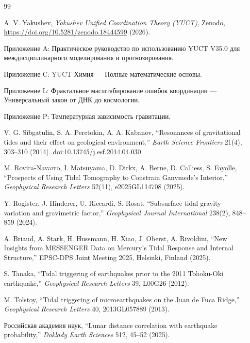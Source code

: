 \documentclass[12pt,a4paper]{article}
\theoremstyle{remark}
\begin{document}
	\begin{thebibliography}{99}
		
		A. V. Yakushev, \emph{Yakushev Unified Coordination Theory (YUCT)}, Zenodo, \url{https://doi.org/10.5281/zenodo.18444599} (2026).
		
		Приложение A: Практическое руководство по использованию YUCT V35.0 для междисциплинарного моделирования и прогнозирования.
		
		Приложение C: YUCT Химия — Полные математические основы.
		
		Приложение L: Фрактальное масштабирование ошибок координации — Универсальный закон от ДНК до космологии.
		
		Приложение P: Температурная зависимость гравитации.
		
		V. G. Sibgatulin, S. A. Peretokin, A. A. Kabanov, ``Resonances of gravitational tides and their effect on geological environment,'' \emph{Earth Science Frontiers} 21(4), 303–310 (2014). doi:10.13745/j.esf.2014.04.030
		
		M. Rovira-Navarro, I. Matsuyama, D. Dirkx, A. Berne, D. Calliess, S. Fayolle, ``Prospects of Using Tidal Tomography to Constrain Ganymede's Interior,'' \emph{Geophysical Research Letters} 52(11), e2025GL114708 (2025).
		
		Y. Rogister, J. Hinderer, U. Riccardi, S. Rosat, ``Subsurface tidal gravity variation and gravimetric factor,'' \emph{Geophysical Journal International} 238(2), 848–859 (2024).
		
		A. Briaud, A. Stark, H. Hussmann, H. Xiao, J. Oberst, A. Rivoldini, ``New Insights from MESSENGER Data on Mercury's Tidal Response and Internal Structure,'' EPSC-DPS Joint Meeting 2025, Helsinki, Finland (2025).
		
		S. Tanaka, ``Tidal triggering of earthquakes prior to the 2011 Tohoku-Oki earthquake,'' \emph{Geophysical Research Letters} 39, L00G26 (2012).
		
		M. Tolstoy, ``Tidal triggering of microearthquakes on the Juan de Fuca Ridge,'' \emph{Geophysical Research Letters} 40, 2013GL057889 (2013).
		
		Российская академия наук, ``Lunar distance correlation with earthquake probability,'' \emph{Doklady Earth Sciences} 512, 45–52 (2025).
		

\end{thebibliography}
\end{document}
